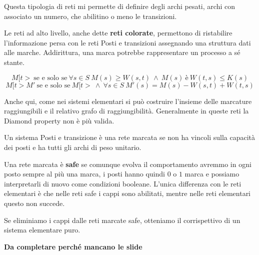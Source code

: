 Questa tipologia di reti mi permette di definire degli archi pesati, archi con associato un numero, che abilitino o meno le transizioni.

Le reti ad alto livello, anche dette \textbf{reti colorate}, permettono di ristabilire l'informazione persa con le reti Posti e transizioni assegnando una struttura dati alle marche. Addirittura, una marca potrebbe rappresentare un processo a sé stante.
\begin{definizione}
    \begin{equation}
        M[t > \ \text{se e solo se} \ \forall s \in S \ M(s) \geq W(s, t) \ \land \ M(s) \ \text{è} \ W(t, s) \leq K(s)
    \end{equation}
    \begin{equation}
        M[t > M' \ \text{se e solo se} \ M[t > \ \land \ \forall s \in S \ M'(s) = M(s) - W(s, t) + W(t, s)
    \end{equation}
\end{definizione}
Anche qui, come nei sistemi elementari si può costruire l'insieme delle marcature raggiungibili e il relativo grafo di raggiungibilità. Generalmente in queste reti la Diamond property non è più valida.
\begin{definizione}
    Un sistema Posti e transizione è una rete marcata se non ha vincoli sulla capacità dei posti e ha tutti gli archi di peso unitario. 
\end{definizione}
Una rete marcata è \textbf{safe} se comunque evolva il comportamento avremmo in ogni posto sempre al più una marca, i posti hanno quindi $0$ o $1$ marca e possiamo interpretarli di nuovo come condizioni booleane. L'unica differenza con le reti elementari è che nelle reti safe i cappi sono abilitati, mentre nelle reti elementari questo non succede.

Se eliminiamo i cappi dalle reti marcate safe, otteniamo il corrispettivo di un sistema elementare puro.

\textbf{Da completare perché mancano le slide}